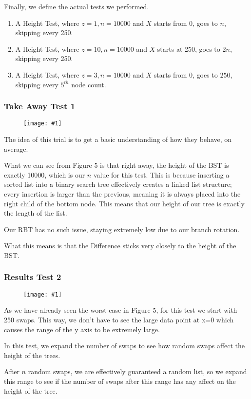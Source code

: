 \documentclass{article}
\newcommand{\figureInsetScaled}[3]
{
    \FloatBarrier{}
    \figureRaw{#1}{#2}{#3}
    \FloatBarrier{}
}
\newcommand{\figureRaw}[3]
{
    \begin{figure}[ht!]
        \centering
        \texttt{[image: \#1]}
        \caption{#2}
    \end{figure}
}
\begin{document}
Finally, we define the actual tests we performed.
\begin{enumerate}
    \item A Height Test, where $z=1, n=10000$ and $X$ starts from 0, goes to $n$, skipping every 250.
    
    \item A Height Test, where $z=10, n=10000$ and $X$ starts at 250, goes to $2n$, skipping every 250.

    \item A Height Test, where $z=3, n=10000$ and $X$ starts from 0, goes to $250$, skipping every $5^{th}$ node count.
\end{enumerate}

\subsubsection{Take Away Test 1}
\figureInsetScaled{images/experiment2/Figure_1.png}{}{0.5}

The idea of this trial is to get a basic understanding of how they behave, on average.

What we can see from Figure 5 is that right away, the height of the BST is exactly 10000, which is our $n$ value for this test. This is because inserting a sorted list into a binary search tree effectively creates a linked list structure; every insertion is larger than the previous, meaning it is always placed into the right child of the bottom node. This means that our height of our tree is exactly the length of the list.

Our RBT has no such issue, staying extremely low due to our branch rotation.

What this means is that the Difference sticks very closely to the height of the BST.

\subsubsection{Results Test 2}
\figureInsetScaled{images/experiment2/Figure_2.png}{}{0.5}

As we have already seen the worst case in Figure 5, for this test we start with 250 swaps. This way, we don't have to see the large data point at x=0 which causes the range of the y axis to be extremely large.

In this test, we expand the number of swaps to see how random swaps affect the height of the trees.

After $n$ random swaps, we are effectively guaranteed a random list, so we expand this range to see if the number of swaps after this range has any affect on the height of the tree.
\end{document}
